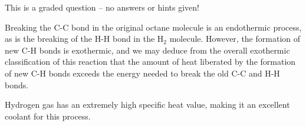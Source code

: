 \vfil 

\eject






This is a graded question -- no answers or hints given!
 






Breaking the C-C bond in the original octane molecule is an endothermic process, as is the breaking of the H-H bond in the H$_{2}$ molecule.  However, the formation of new C-H bonds is exothermic, and we may deduce from the overall exothermic classification of this reaction that the amount of heat liberated by the formation of new C-H bonds exceeds the energy needed to break the old C-C and H-H bonds.

\vskip 10pt

Hydrogen gas has an extremely high specific heat value, making it an excellent coolant for this process.




